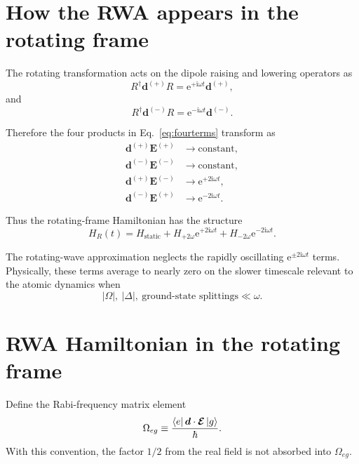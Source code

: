 \documentclass[11pt]{article}
\newcommand{\ee}{\mathrm{e}}
\newcommand{\ii}{\mathrm{i}}
\newcommand{\HR}{H_R}
\begin{document}
\section{How the RWA appears in the rotating frame}

The rotating transformation acts on the dipole raising and lowering operators as
\begin{equation}
R^\dagger\bm d^{(+)}R
=
\ee^{+\ii\omega t}\bm d^{(+)},
\label{eq:dplusrot}
\end{equation}
and
\begin{equation}
R^\dagger\bm d^{(-)}R
=
\ee^{-\ii\omega t}\bm d^{(-)}.
\label{eq:dminusrot}
\end{equation}

Therefore the four products in Eq.~\eqref{eq:fourterms} transform as
\begin{align}
\bm d^{(+)}\bm E^{(+)} &\longrightarrow \text{constant},
\label{eq:slow1}\\
\bm d^{(-)}\bm E^{(-)} &\longrightarrow \text{constant},
\label{eq:slow2}\\
\bm d^{(+)}\bm E^{(-)} &\longrightarrow \ee^{+2\ii\omega t},
\label{eq:fast1}\\
\bm d^{(-)}\bm E^{(+)} &\longrightarrow \ee^{-2\ii\omega t}.
\label{eq:fast2}
\end{align}

Thus the rotating-frame Hamiltonian has the structure
\begin{equation}
\HR(t)
=
H_{\mathrm{static}}
+
H_{+2\omega}\ee^{+2\ii\omega t}
+
H_{-2\omega}\ee^{-2\ii\omega t}.
\label{eq:HRstructure}
\end{equation}

The rotating-wave approximation neglects the rapidly oscillating $\ee^{\pm2\ii\omega t}$ terms. Physically, these terms average to nearly zero on the slower timescale relevant to the atomic dynamics when
\begin{equation}
|\Omega|,\ |\Delta|,\ \text{ground-state splittings}
\ll
\omega.
\label{eq:RWAcondition}
\end{equation}

\section{RWA Hamiltonian in the rotating frame}

Define the Rabi-frequency matrix element
\begin{equation}
\Omega_{eg}
\equiv
\frac{\bra{e}\bm d\cdot\bm{\mathcal E}\ket{g}}{\hbar}.
\label{eq:Rabi}
\end{equation}
With this convention, the factor $1/2$ from the real field is not absorbed into $\Omega_{eg}$.
\end{document}
